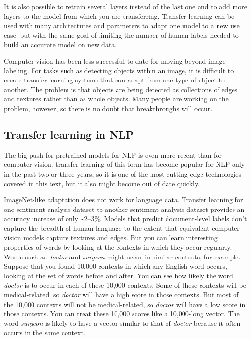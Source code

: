 \documentclass[sigconf,nonacm,screen,pbalance]{acmart}
\begin{document}
It
is also possible to retrain several layers instead of the last one and to add more
layers to the model from which you are transferring. Transfer learning can be used with
many architectures and parameters to adapt one model to a new use case, but with the
same goal of limiting the number of human labels needed to build an accurate model on
new data.

Computer
vision has been less successful to date for moving beyond image labeling. For tasks such
as detecting objects within an image, it is difficult to create transfer learning
systems that can adapt from one type of object to another. The problem is that objects
are being detected as collections of edges and textures rather than as whole objects.
Many people are working on the problem, however, so there is no doubt that breakthroughs
will occur.

\subsection{Transfer learning in NLP}
The
big
push for pretrained models for NLP is even more recent than for computer vision.
transfer learning of this form has become popular for NLP only in the past two or three
years, so it is one of the most cutting-edge technologies covered in this text, but it
also might become out of date quickly.

ImageNet-like
adaptation does not work for language data. Transfer learning for one sentiment analysis
dataset to another sentiment analysis dataset provides an accuracy increase of only
\textasciitilde 2–3\%. Models that predict document-level labels don't capture the breadth of human
language to the extent that equivalent computer vision models capture textures and
edges. But you can learn interesting properties of words by looking at the contexts in
which they occur regularly. Words such as {\em doctor} and {\em surgeon} might occur
in similar contexts, for example. Suppose that you found 10,000 contexts in which any
English word occurs, looking at the set of words before and after. You can see how
likely the word {\em doctor} is to occur in each of these 10,000 contexts. Some of
these contexts will be medical-related, so {\em doctor} will have a high score in those
contexts. But most of the 10,000 contexts will not be medical-related, so {\em doctor}
will have a low score in those contexts. You can treat these 10,000 scores like a
10,000-long vector. The word {\em surgeon} is likely to have a vector similar to that
of {\em doctor} because it often occurs in the same context.
\end{document}
